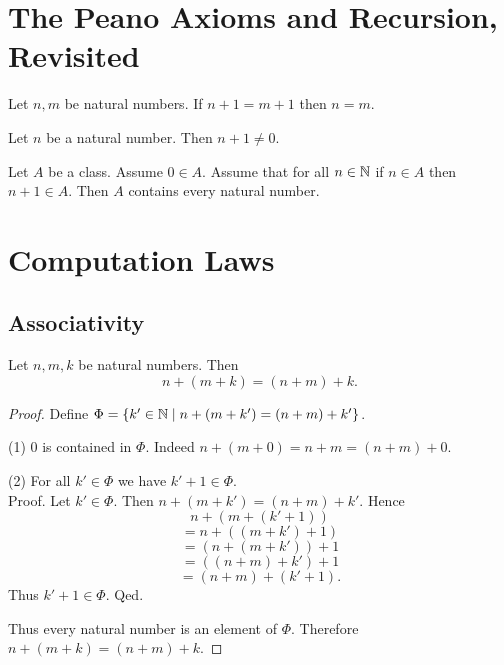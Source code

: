 \documentclass[10pt]{article}
\begin{document}
  \section{The Peano Axioms and Recursion, Revisited}

  \begin{forthel}
    \begin{proposition}
      Let $n, m$ be natural numbers.
      If $n + 1 = m + 1$ then $n = m$.
    \end{proposition}
  \end{forthel}

  \begin{forthel}
    \begin{proposition}
      Let $n$ be a natural number.
      Then $n + 1 \neq 0$.
    \end{proposition}
  \end{forthel}

  \begin{forthel}
    \begin{proposition}[Induction]
      Let $A$ be a class.
      Assume $0 \in A$.
      Assume that for all $n \in \mathbb{N}$ if $n \in A$ then $n + 1 \in A$.
      Then $A$ contains every natural number.
    \end{proposition}
  \end{forthel}


  \section{Computation Laws}

  \subsection{Associativity}

  \begin{forthel}
    \begin{proposition}
      Let $n, m, k$ be natural numbers.
      Then \[ n + (m + k) = (n + m) + k. \]
    \end{proposition}
    \begin{proof}
      Define $\Phi = \{ k' \in \mathbb{N} \mid n + (m + k') = (n + m) + k' \}$.

      (1) $0$ is contained in $\Phi$.
      Indeed $n + (m + 0) = n + m = (n + m) + 0$.

      (2) For all $k' \in \Phi$ we have $k' + 1 \in \Phi$. \\
      Proof.
        Let $k' \in \Phi$.
        Then $n + (m + k') = (n + m) + k'$.
        Hence
        \[  n + (m + (k' + 1))        \]
        \[    = n + ((m + k') + 1)    \]
        \[    = (n + (m + k')) + 1    \]
        \[    = ((n + m) + k') + 1    \]
        \[    = (n + m) + (k' + 1).   \]
        Thus $k' + 1 \in \Phi$.
      Qed.

      Thus every natural number is an element of $\Phi$.
      Therefore $n + (m + k) = (n + m) + k$.
    \end{proof}
  \end{forthel}
\end{document}
